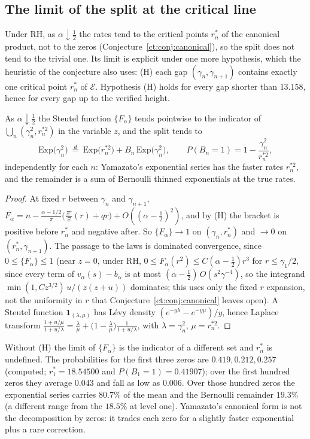 \subsection{The limit of the split at the critical line}
Under RH, as $\alpha\downarrow\frac12$ the rates tend to the critical points $r^*_n$ of the canonical product, not to the zeros (Conjecture~\ref{ct:conj:canonical}), so the split does not tend to the trivial one. Its limit is explicit under one more hypothesis, which the heuristic of the conjecture also uses: (H) each gap $(\gamma_n,\gamma_{n+1})$ contains exactly one critical point $r^*_n$ of $\mathcal E$. Hypothesis (H) holds for every gap shorter than $13.158$, hence for every gap up to the verified height.
\begin{proposition}\label{ct:prop:bernoulli}
As $\alpha\downarrow\frac12$ the Steutel function $\{F_\alpha\}$ tends pointwise to the indicator of $\bigcup_n(\gamma_n^2,r_n^{*2})$ in the variable $z$, and the split tends to
\[
\mathrm{Exp}\big(\gamma_n^2\big)\ \stackrel{d}{=}\ \mathrm{Exp}\big(r_n^{*2}\big)+B_n\,\mathrm{Exp}\big(\gamma_n^2\big),\qquad P(B_n=1)=1-\frac{\gamma_n^2}{r_n^{*2}},
\]
independently for each $n$: Yamazato's exponential series has the faster rates $r_n^{*2}$, and the remainder is a sum of Bernoulli thinned exponentials at the true rates.
\end{proposition}
\begin{proof}
At fixed $r$ between $\gamma_n$ and $\gamma_{n+1}$, $F_\alpha=n-\frac{\alpha-1/2}{\pi}\big(\frac{\Xi'}{\Xi}(r)+qr\big)+O((\alpha-\frac12)^2)$, and by (H) the bracket is positive before $r^*_n$ and negative after. So $\{F_\alpha\}\to1$ on $(\gamma_n,r^*_n)$ and $\to0$ on $(r^*_n,\gamma_{n+1})$. The passage to the laws is dominated convergence, since $0\le\{F_\alpha\}\le1$ (near $z=0$, under RH, $0\le F_\alpha(r^2)\le C(\alpha-\frac12)r^3$ for $r\le\gamma_1/2$, since every term of $v_\alpha(s)-b_\alpha$ is at most $(\alpha-\frac12)\,O(s^2\gamma^{-4})$, so the integrand $\min(1,Cz^{3/2})\,u/(z(z+u))$ dominates; this uses only the fixed $r$ expansion, not the uniformity in $r$ that Conjecture~\ref{ct:conj:canonical} leaves open). A Steutel function $\mathbf 1_{(\lambda,\mu)}$ has L\'evy density $(e^{-y\lambda}-e^{-y\mu})/y$, hence Laplace transform $\frac{1+u/\mu}{1+u/\lambda}=\frac\lambda\mu+\big(1-\frac\lambda\mu\big)\frac1{1+u/\lambda}$, with $\lambda=\gamma_n^2$, $\mu=r_n^{*2}$.
\end{proof}
Without (H) the limit of $\{F_\alpha\}$ is the indicator of a different set and $r^*_n$ is undefined. The probabilities for the first three zeros are $0.419,\allowbreak0.212,\allowbreak0.257$ (computed; $r_1^*=18.54500$ and $P(B_1=1)=0.41907$); over the first hundred zeros they average $0.043$ and fall as low as $0.006$. Over those hundred zeros the exponential series carries $80.7\%$ of the mean and the Bernoulli remainder $19.3\%$ (a different range from the $18.5\%$ at level one). Yamazato's canonical form is not the decomposition by zeros: it trades each zero for a slightly faster exponential plus a rare correction.

